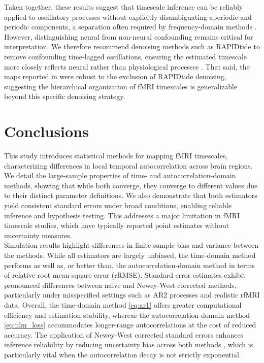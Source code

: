 \documentclass[9pt]{article}
\begin{document}
Taken together, these results suggest that timescale inference can be reliably applied to oscillatory processes without explicitly disambiguating aperiodic and periodic components, a separation often required by frequency-domain methods \citep{donoghue_parameterizing_2020, gao_neuronal_2020}. However, distinguishing neural from non-neural confounding remains critical for interpretation. We therefore recommend denoising methods such as RAPIDtide to remove confounding time-lagged oscillations, ensuring the estimated timescale more closely reflects neural rather than physiological processes \citep{frederick_rapidtide_2025}. That said, the maps reported in  were robust to the exclusion of RAPIDtide denoising, suggesting the hierarchical organization of fMRI timescales is generalizable beyond this specific denoising strategy.

\section{Conclusions}
This study introduces statistical methods for mapping fMRI timescales, characterizing differences in local temporal autocorrelation across brain regions. We detail the large-sample properties of time- and autocorrelation-domain methods, showing that while both converge, they converge to different values due to their distinct parameter definitions. We also demonstrate that both estimators yield consistent standard errors under broad conditions, enabling reliable inference and hypothesis testing. This addresses a major limitation in fMRI timescale studies, which have typically reported point estimates without uncertainty measures.\\

Simulation results highlight differences in finite sample bias and variance between the methods. While all estimators are largely unbiased, the time-domain method performs as well as, or better than, the autocorrelation-domain method in terms of relative root mean square error (rRMSE). Standard error estimates exhibit pronounced differences between naive and Newey-West corrected methods, particularly under misspecified settings such as AR2 processes and realistic rfMRI data. Overall, the time-domain method \eqref{eq:ar1} offers greater computational efficiency and estimation stability, whereas the autocorrelation-domain method \eqref{eq:nlm_loss} accommodates longer-range autocorrelations at the cost of reduced accuracy. The application of Newey-West corrected standard errors enhances inference reliability by reducing uncertainty bias across both methods \citep{newey_simple_1987}, which is particularly vital when the autocorrelation decay is not strictly exponential.\\
\end{document}
